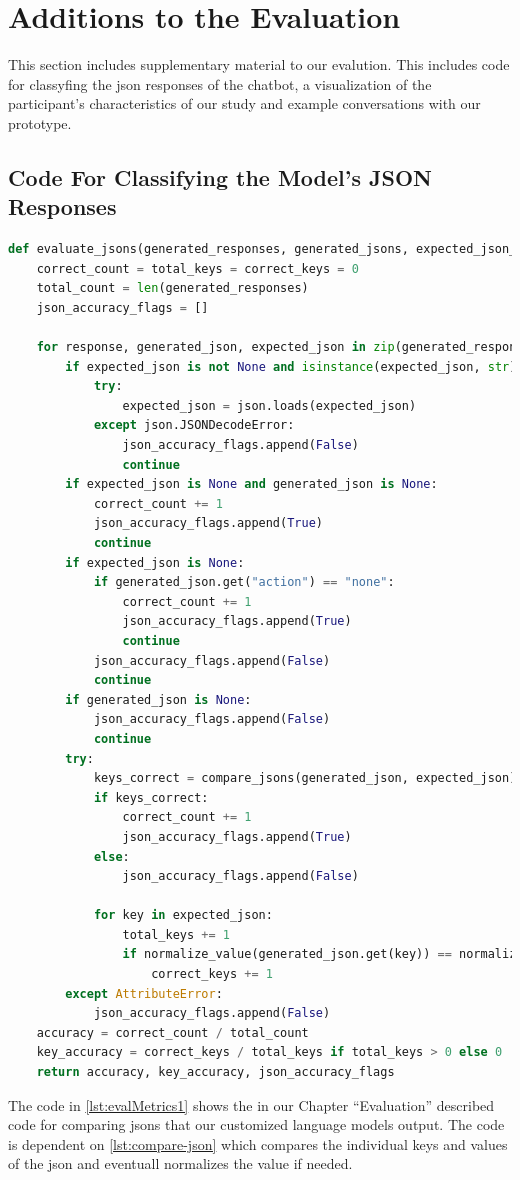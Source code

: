 \section{Additions to the Evaluation}
This section includes supplementary material to our evalution. This includes code for classyfing the \gls{json} responses of the chatbot, a visualization of the participant's characteristics of our study and example conversations with our prototype.
\subsection{Code For Classifying the Model's JSON Responses}
\begin{Listing}
    \begin{lstlisting}[language=Python]
def evaluate_jsons(generated_responses, generated_jsons, expected_json_values):
    correct_count = total_keys = correct_keys = 0
    total_count = len(generated_responses)
    json_accuracy_flags = []

    for response, generated_json, expected_json in zip(generated_responses, generated_jsons, expected_json_values):
        if expected_json is not None and isinstance(expected_json, str):
            try:
                expected_json = json.loads(expected_json)
            except json.JSONDecodeError:
                json_accuracy_flags.append(False)
                continue     
        if expected_json is None and generated_json is None:
            correct_count += 1
            json_accuracy_flags.append(True)
            continue
        if expected_json is None:
            if generated_json.get("action") == "none": 
                correct_count += 1
                json_accuracy_flags.append(True)
                continue
            json_accuracy_flags.append(False)
            continue   
        if generated_json is None:
            json_accuracy_flags.append(False)
            continue
        try:
            keys_correct = compare_jsons(generated_json, expected_json)
            if keys_correct:
                correct_count += 1
                json_accuracy_flags.append(True)
            else:
                json_accuracy_flags.append(False)
            
            for key in expected_json:
                total_keys += 1
                if normalize_value(generated_json.get(key)) == normalize_value(expected_json.get(key)):
                    correct_keys += 1
        except AttributeError:
            json_accuracy_flags.append(False)  
    accuracy = correct_count / total_count
    key_accuracy = correct_keys / total_keys if total_keys > 0 else 0
    return accuracy, key_accuracy, json_accuracy_flags
  \end{lstlisting}
    \caption{Code for Classificiation of the models responded JSONs}
    \label{lst:evalMetrics1}
\end{Listing}
\newpage
The code in \cref{lst:evalMetrics1} shows the in our Chapter ``Evaluation'' described code for comparing \glspl{json} that our customized language models output. The code is dependent on \cref{lst:compare-json} which compares the individual keys and values of the \gls{json} and eventuall normalizes the value if needed. 

